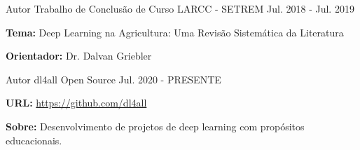 
\begin{cventries}
	\cventry
	{Autor} %
	{Trabalho de Conclusão de Curso} %
	{LARCC - SETREM} %
	{Jul. 2018 - Jul. 2019} %
	{
		\begin{cvitems} %
			\item {\textbf{Tema:} Deep Learning na Agricultura: Uma Revisão Sistemática da Literatura}
			\item {\textbf{Orientador:} Dr. Dalvan Griebler}
		\end{cvitems}
	}

	\cventry
	{Autor} %
	{dl4all} %
	{Open Source} %
	{Jul. 2020 - PRESENTE} %
	{
		\begin{cvitems} %
			\item {\textbf{URL:} \href{https://github.com/dl4all}{https://github.com/dl4all}}
			\item {\textbf{Sobre:} Desenvolvimento de projetos de deep learning com propósitos educacionais.}
		\end{cvitems}
	}
\end{cventries}
